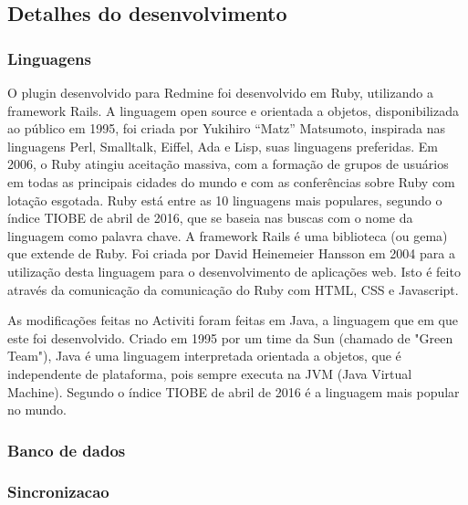 \subsection{Detalhes do desenvolvimento}\label{sec:integracao_redmine_activiti_implementacao_detalhes_desenvolvimento}

\subsubsection{Linguagens}\label{sec:integracao_redmine_activiti_implementacao_detalhes_desenvolvimento_linguagens}

O plugin desenvolvido para Redmine foi desenvolvido em Ruby, utilizando a framework Rails. A linguagem open source e orientada a objetos, disponibilizada ao público em 1995, foi criada por Yukihiro “Matz” Matsumoto, inspirada nas linguagens Perl, Smalltalk, Eiffel, Ada e Lisp, suas linguagens preferidas. Em 2006, o Ruby atingiu aceitação massiva, com a formação de grupos de usuários em todas as principais cidades do mundo e com as conferências sobre Ruby com lotação esgotada. Ruby está entre as 10 linguagens mais populares, segundo o índice TIOBE de abril de 2016, que se baseia nas buscas com o nome da linguagem como palavra chave. A framework Rails é uma biblioteca (ou gema) que extende de Ruby. Foi criada por David Heinemeier Hansson em 2004 para a utilização desta linguagem para o desenvolvimento de aplicações web. Isto é feito através da comunicação da comunicação do Ruby com HTML, CSS e Javascript.

As modificações feitas no Activiti foram feitas em Java, a linguagem que em que este foi desenvolvido. Criado em 1995 por um time da Sun (chamado de "Green Team"), Java é uma linguagem interpretada orientada a objetos,  que é independente de plataforma, pois sempre executa na JVM (Java Virtual Machine). Segundo o índice TIOBE de abril de 2016 é a linguagem mais popular no mundo.

\subsubsection{Banco de dados}\label{sec:integracao_redmine_activiti_implementacao_detalhes_desenvolvimento_bd}

\subsubsection{Sincronizacao}\label{sec:integracao_redmine_activiti_implementacao_detalhes_desenvolvimento_sincronizacao}

